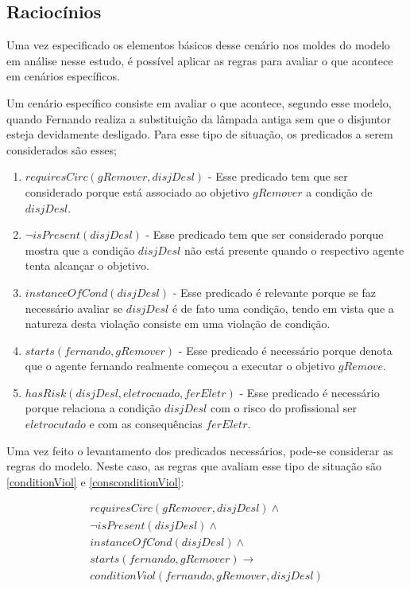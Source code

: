 \subsection{Raciocínios}

Uma vez especificado os elementos básicos desse cenário nos moldes do modelo em análise nesse estudo, é possível aplicar as regras para avaliar o que acontece em cenários específicos. 

Um cenário específico consiste em avaliar o que acontece, segundo esse modelo, quando Fernando realiza a substituição da lâmpada antiga sem que o disjuntor esteja devidamente desligado. Para esse tipo de situação, os predicados a serem considerados são esses;

\begin{enumerate}
	\item $requiresCirc(gRemover,disjDesl)$ - Esse predicado tem que ser considerado porque está associado ao objetivo $gRemover$ a condição de $disjDesl$.
	\item $\neg isPresent(disjDesl)$ - Esse predicado tem que ser considerado porque mostra que a condição $disjDesl$ não está presente quando o respectivo agente tenta alcançar o objetivo.
	\item $instanceOfCond(disjDesl)$ - Esse predicado é relevante porque se faz necessário avaliar se $disjDesl$ é de fato uma condição, tendo em vista que a natureza desta violação consiste em uma violação de condição.
	\item $starts(fernando,gRemover)$ - Esse predicado é necessário porque denota que o agente fernando realmente começou a executar o objetivo $gRemove$.
	\item $hasRisk(disjDesl, eletrocuado, ferEletr)$ - Esse predicado é necessário porque relaciona a condição $disjDesl$ com o risco do profissional ser $eletrocutado$ e com as consequências $ferEletr$.
\end{enumerate}

Uma vez feito o levantamento dos predicados necessários, pode-se considerar as regras do modelo. Neste caso, as regras que avaliam esse tipo de situação são \ref{conditionViol} e \ref{consconditionViol}:

\begin{eqnarray}\label{applicationCodViolIntrodCase}\nonumber
	requiresCirc(gRemover,disjDesl) \wedge \\ \nonumber   
	\neg isPresent(disjDesl) \wedge  \\ \nonumber   
	instanceOfCond(disjDesl) \wedge \\ \nonumber   
	starts(fernando,gRemover)  \to \\ \nonumber   
	conditionViol(fernando,gRemover,disjDesl) \nonumber \\  
\end{eqnarray}

